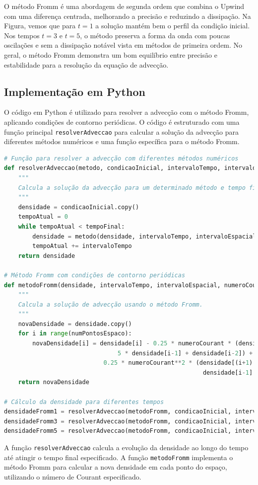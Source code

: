 O método Fromm é uma abordagem de segunda ordem que combina o Upwind com uma diferença centrada, melhorando a precisão e reduzindo a dissipação. Na Figura, vemos que para \( t = 1 \) a solução mantém bem o perfil da condição inicial. Nos tempos \( t = 3 \) e \( t = 5 \), o método preserva a forma da onda com poucas oscilações e sem a dissipação notável vista em métodos de primeira ordem. No geral, o método Fromm demonstra um bom equilíbrio entre precisão e estabilidade para a resolução da equação de advecção.


\subsection{Implementação em Python}

O código em Python é utilizado para resolver a advecção com o método Fromm, aplicando condições de contorno periódicas. O código é estruturado com uma função principal \texttt{resolverAdveccao} para calcular a solução da advecção para diferentes métodos numéricos e uma função específica para o método Fromm.

\begin{lstlisting}[language=Python, caption={Código para resolver a advecção usando o método Fromm}, label={lst:codigo_fromm}]
# Função para resolver a advecção com diferentes métodos numéricos
def resolverAdveccao(metodo, condicaoInicial, intervaloTempo, intervaloEspacial, numeroCourant, tempoFinal):
    """
    Calcula a solução da advecção para um determinado método e tempo final.
    """
    densidade = condicaoInicial.copy()
    tempoAtual = 0
    while tempoAtual < tempoFinal:
        densidade = metodo(densidade, intervaloTempo, intervaloEspacial, numeroCourant)
        tempoAtual += intervaloTempo
    return densidade

# Método Fromm com condições de contorno periódicas
def metodoFromm(densidade, intervaloTempo, intervaloEspacial, numeroCourant):
    """
    Calcula a solução de advecção usando o método Fromm.
    """
    novaDensidade = densidade.copy()
    for i in range(numPontosEspaco):
        novaDensidade[i] = densidade[i] - 0.25 * numeroCourant * (densidade[(i+1) \% numPontosEspaco] + 3 * densidade[i] - \
                                5 * densidade[i-1] + densidade[i-2]) + \
                            0.25 * numeroCourant**2 * (densidade[(i+1) \% numPontosEspaco] - densidade[i] - \
                                                        densidade[i-1] + densidade[i-2])
    return novaDensidade

# Cálculo da densidade para diferentes tempos
densidadeFromm1 = resolverAdveccao(metodoFromm, condicaoInicial, intervaloTempo, intervaloEspacial, numeroCourant, tempoFinal1)
densidadeFromm3 = resolverAdveccao(metodoFromm, condicaoInicial, intervaloTempo, intervaloEspacial, numeroCourant, tempoFinal3)
densidadeFromm5 = resolverAdveccao(metodoFromm, condicaoInicial, intervaloTempo, intervaloEspacial, numeroCourant, tempoFinal5)
\end{lstlisting}

A função \texttt{resolverAdveccao} calcula a evolução da densidade ao longo do tempo até atingir o tempo final especificado. A função \texttt{metodoFromm} implementa o método Fromm para calcular a nova densidade em cada ponto do espaço, utilizando o número de Courant especificado.
